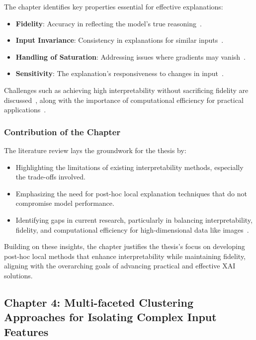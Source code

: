 The chapter identifies key properties essential for effective explanations:
\begin{itemize}
    \item \textbf{Fidelity}: Accuracy in reflecting the model's true reasoning~\cite{SundararajanTY17}.
    \item \textbf{Input Invariance}: Consistency in explanations for similar inputs~\cite{AnconaCOG19}.
    \item \textbf{Handling of Saturation}: Addressing issues where gradients may vanish~\cite{NielsenDRRB22}.
    \item \textbf{Sensitivity}: The explanation's responsiveness to changes in input~\cite{SundararajanTY17}.
\end{itemize}

Challenges such as achieving high interpretability without sacrificing fidelity are discussed~\cite{KindermansHAASDEK19, AdebayoGMGHK18}, along with the importance of computational efficiency for practical applications~\cite{GhorbaniAZ19}.

\subsubsection*{Contribution of the Chapter}

The literature review lays the groundwork for the thesis by:
\begin{itemize}
    \item Highlighting the limitations of existing interpretability methods, especially the trade-offs involved.
    \item Emphasizing the need for post-hoc local explanation techniques that do not compromise model performance.
    \item Identifying gaps in current research, particularly in balancing interpretability, fidelity, and computational efficiency for high-dimensional data like images~\cite{YehHSIR19}.
\end{itemize}

Building on these insights, the chapter justifies the thesis's focus on developing post-hoc local methods that enhance interpretability while maintaining fidelity, aligning with the overarching goals of advancing practical and effective XAI solutions.


\subsection{Chapter 4: Multi-faceted Clustering Approaches
for Isolating Complex Input Features}

